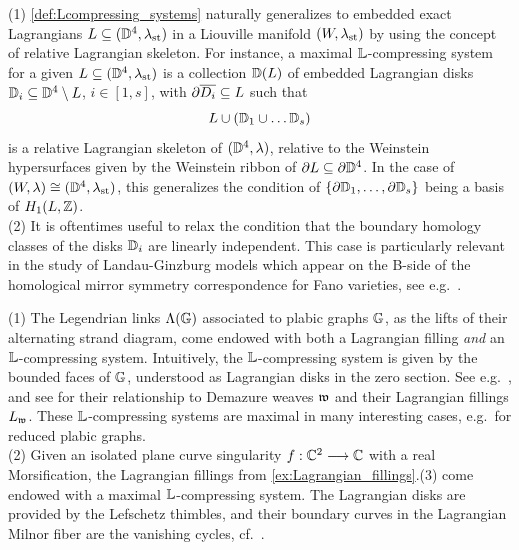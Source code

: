 \begin{remark} (1) \cref{def:Lcompressing_systems} naturally generalizes to embedded exact Lagrangians $L\subseteq (\mathbb{D}^4,\lambda_{\text{st}})$ in a Liouville manifold $(W,\lambda_{\text{st}})$ by using the concept of relative Lagrangian skeleton. For instance, a maximal $\mathbb{L}$-compressing system for a given $L\subseteq(\mathbb{D}^4,\lambda_{\text{st}})$ is a collection $\mathbb{D}(L)$ of embedded Lagrangian disks $\mathbb{D}_i\subseteq \mathbb{D}^4\setminus L$, $i\in[1,s]$, with $\partial\overline{D_i}\subseteq L$ such that
$$L\cup(\mathbb{D}_1\cup\ldots\mathbb{D}_s)$$
is a relative Lagrangian skeleton of $(\mathbb{D}^4,\lambda)$, relative to the Weinstein hypersurfaces given by the Weinstein ribbon of $\partial L\subseteq\partial\mathbb{D}^4$. In the case of $(W,\lambda)\cong (\mathbb{D}^4,\lambda_{\text{st}})$, this generalizes the condition of $\{\partial\mathbb{D}_1,\ldots,\partial\mathbb{D}_s\}$ being a basis of $H_1(L,\mathbb{Z})$.\\

\noindent (2) It is oftentimes useful to relax the condition that the boundary homology classes of the disks $\mathbb{D}_i$ are linearly independent. This case is particularly relevant in the study of Landau-Ginzburg models which appear on the B-side of the homological mirror symmetry correspondence for Fano varieties, see e.g.~\cite{PascaleffTonkonog20}.\sbs
\end{remark}

\begin{example}\label{ex:Lcompressing_systems} (1) The Legendrian links $\Lambda(\mathbb{G})$ associated to plabic graphs $\mathbb{G}$, as the lifts of their alternating strand diagram, come endowed with both a Lagrangian filling {\it and} an $\mathbb{L}$-compressing system. Intuitively, the $\mathbb{L}$-compressing system is given by the bounded faces of $\mathbb{G}$, understood as Lagrangian disks in the zero section. See e.g.~\cite[Section 4.3]{CasalsGao24}, and see \cite[Section 3]{casals2023demazureweavesreducedplabic} for their relationship to Demazure weaves $\mathfrak{w}$ and their Lagrangian fillings $L_{\mathfrak{w}}$. These $\mathbb{L}$-compressing systems are maximal in many interesting cases, e.g.~for reduced plabic graphs.\\

\noindent (2) Given an isolated plane curve singularity $f:\mathbb{C}^2\longrightarrow\mathbb{C}$ with a real Morsification, the Lagrangian fillings from \cref{ex:Lagrangian_fillings}.(3) come endowed with a maximal $\mathbb{L}$-compressing system. The Lagrangian disks are provided by the Lefschetz thimbles, and their boundary curves in the Lagrangian Milnor fiber are the vanishing cycles, cf.~\cite[Section 2]{CasalsLagSkel}.\sbs
\end{example}

